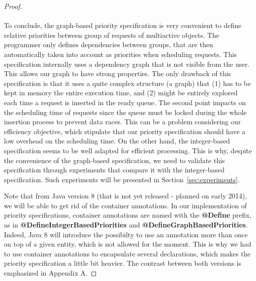 \documentclass[11pt]{report}
\begin{document}
\begin{proof}

\paragraph{}
To conclude, the graph-based priority specification is very convenient to define relative priorities between group of requests of multiactive objects. The programmer only defines dependencies between groups, that are then automatically taken into account as priorities when scheduling requests. This specification internally uses a dependency graph that is not visible from the user. This allows our graph to have strong properties. The only drawback of this specification is that it uses a quite complex structure (a graph) that (1) has to be kept in memory the entire execution time, and (2) might be entirely explored each time a request is inserted in the ready queue. The second point impacts on the scheduling time of requests since the queue must be locked during the whole insertion process to prevent data races. This can be a problem considering our efficiency objective, which stipulate that our priority specification should have a low overhead on the scheduling time. On the other hand, the integer-based specification seems to be well adapted for efficient processing. This is why, despite the convenience of the graph-based specification, we need to validate this specification through experiments that compare it with the integer-based specification. Such experiments will be presented in Section~\ref{sec:experiments}.

Note that from Java version 8 (that is not yet released - planned on early 2014), we will be able to get rid of the container annotations. In our implementation of priority specifications, container annotations are named with the \textbf{@Define} prefix, as in \textbf{@DefineIntegerBasedPriorities} and \textbf{@DefineGraphBasedPriorities}. Indeed, Java 8 will introduce the possibilty to use an annotation more than once on top of a given entity, which is not allowed for the moment. This is why we had to use container annotations to encapsulate several declarations, which makes the priority specification a little bit heavier. The contrast between both versions is emphasized in Appendix A.


\end{proof}
\end{document}
